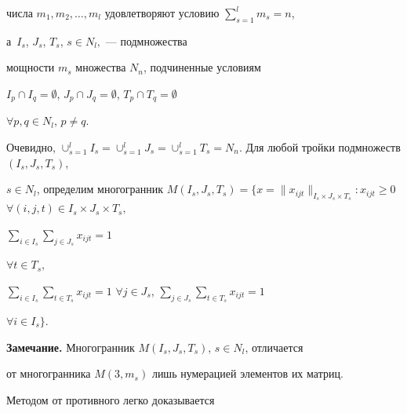 числа $m_1,m_2,\dotsc,m_l$ удовлетворяют условию $\sum\limits_{s=1}^l m_s=n$,


а~$I_s$, $J_s$, $T_s$, $s\in N_l,$ --- подмножества


мощности $m_s$ множества $N_n$, подчиненные условиям


$I_p\cap I_q=\emptyset$, $J_p\cap J_q=\emptyset$, $T_p\cap T_q=\emptyset$


$\forall p,q\in N_l$, $p\neq q.$


Очевидно, $\cup_{s=1}^l I_s=\cup_{s=1}^l


J_s=\cup_{s=1}^l T_s=N_n$. Для любой тройки подмножеств $(I_s,J_s,T_s)$,


$s\in N_l$, определим многогранник $M(I_s,J_s,T_s)=\Big\{x=\|


x_{ijt}\|_{I_s\times J_s\times T_s}:x_{ijt}\geq 0$ $\forall


(i,j,t)\in I_s\times J_s\times T_s,$


$\sum\limits_{i\in I_s}\sum\limits_{j\in J_s} x_{ijt}=1$


$\forall t\in T_s,$


$\sum\limits_{i\in I_s}\sum\limits_{t\in T_s} x_{ijt}=1$ $\forall


j\in J_s$, $\sum\limits_{j\in J_s}\sum\limits_{t\in T_s} x_{ijt}=1$


$\forall i\in I_s\Big\}.$


\medskip





{\bf Замечание.} Многогранник $M(I_s,J_s,T_s)$, $s\in N_l$, отличается


от многогранника $M(3,m_s)$ лишь нумерацией элементов их матриц.


\medskip





Методом от противного легко доказывается





